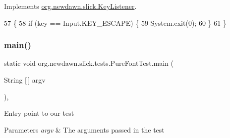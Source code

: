 Implements \mbox{\hyperlink{interfaceorg_1_1newdawn_1_1slick_1_1_key_listener_ac0b0568a21ef486c4f51382614c196ef}{org.\+newdawn.\+slick.\+Key\+Listener}}.


\begin{DoxyCode}
57                                             \{
58         \textcolor{keywordflow}{if} (key == Input.KEY\_ESCAPE) \{
59             System.exit(0);
60         \}
61     \}
\end{DoxyCode}
\mbox{\label{classorg_1_1newdawn_1_1slick_1_1tests_1_1_pure_font_test_af075b56a41973e4024f3ef30d9ac789f}} 
\subsubsection{\texorpdfstring{main()}{main()}}
{\footnotesize\ttfamily static void org.\+newdawn.\+slick.\+tests.\+Pure\+Font\+Test.\+main (\begin{DoxyParamCaption}\item[{String \mbox{[}$\,$\mbox{]}}]{argv }\end{DoxyParamCaption})\hspace{0.3cm}{\ttfamily [inline]}, {\ttfamily [static]}}

Entry point to our test


\begin{DoxyParams}{Parameters}
{\em argv} & The arguments passed in the test \\
\hline
\end{DoxyParams}

